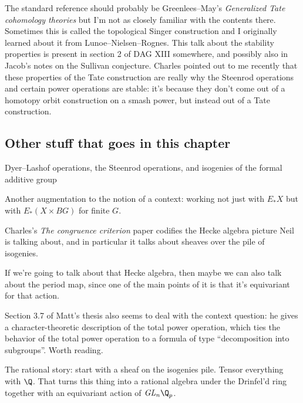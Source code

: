 The standard reference should probably be Greenlees--May's \textit{Generalized Tate cohomology theories} but I'm not as closely familiar with the contents there. Sometimes this is called the topological Singer construction and I originally learned about it from Lunoe--Nielsen--Rognes. This talk about the stability properties is present in section 2 of DAG XIII somewhere, and possibly also in Jacob's notes on the Sullivan conjecture. Charles pointed out to me recently that these properties of the Tate construction are really why the Steenrod operations and certain power operations are stable: it's because they don't come out of a homotopy orbit construction on a smash power, but instead out of a Tate construction.









\subsection*{Other stuff that goes in this chapter}

Dyer--Lashof operations, the Steenrod operations, and isogenies of the formal additive group 

Another augmentation to the notion of a context: working not just with $E_* X$ but with $E_*(X \times BG)$ for finite $G$.

Charles's \textit{The congruence criterion} paper codifies the Hecke algebra picture Neil is talking about, and in particular it talks about sheaves over the pile of isogenies.

If we're going to talk about that Hecke algebra, then maybe we can also talk about the period map, since one of the main points of it is that it's equivariant for that action.

Section 3.7 of Matt's thesis also seems to deal with the context question: he gives a character-theoretic description of the total power operation, which ties the behavior of the total power operation to a formula of type ``decomposition into subgroups''.  Worth reading.

The rational story: start with a sheaf on the isogenies pile.  Tensor everything with $\Q$.  That turns this thing into a rational algebra under the Drinfel'd ring together with an equivariant action of $\GL_n \Q_p$.

